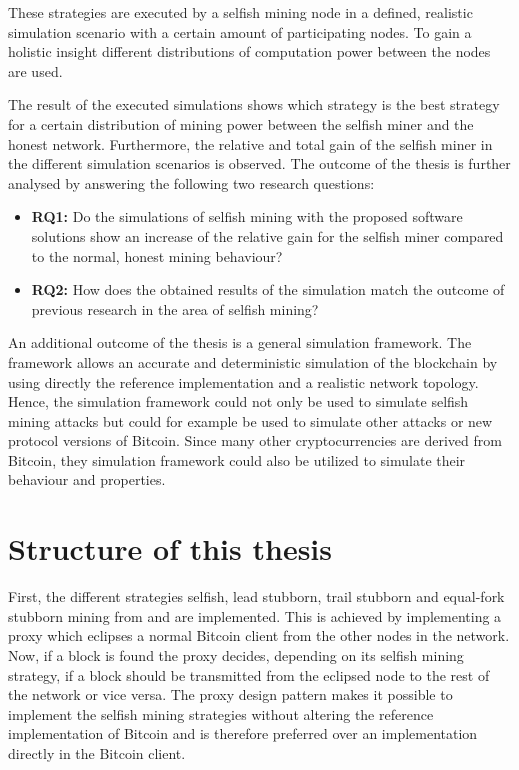 These strategies are executed by a selfish mining node in a defined, realistic simulation scenario with a certain amount of participating nodes.
To gain a holistic insight different distributions of computation power between the nodes are used.

The result of the executed simulations shows which strategy is the best strategy for a certain distribution of mining power between the selfish miner and the honest network.
Furthermore, the relative and total gain of the selfish miner in the different simulation scenarios is observed. The outcome of the thesis is further analysed by answering the following two research questions:

\begin{itemize}
	\item \textbf{RQ1:} Do the simulations of selfish mining with the proposed software solutions show an increase of the relative gain for the selfish miner compared to the normal, honest mining behaviour?

	\item \textbf{RQ2:} How does the obtained results of the simulation match the outcome of previous research in the area of selfish mining?
\end{itemize}


An additional outcome of the thesis is a general simulation framework.
The framework allows an accurate and deterministic simulation of the blockchain by using directly the reference implementation and a realistic network topology.
Hence, the simulation framework could not only be used to simulate selfish mining attacks but could for example be used to simulate other attacks or new protocol versions of Bitcoin. 
Since many other cryptocurrencies are derived from Bitcoin, they simulation framework could also be utilized to simulate their behaviour and properties.

\section{Structure of this thesis}

First, the different strategies selfish, lead stubborn, trail stubborn and equal-fork stubborn mining from \cite{nayak2016stubborn} and \cite{eyal2014majority} are implemented.
This is achieved by implementing a proxy which eclipses a normal Bitcoin client from the other nodes in the network.
Now, if a block is found the proxy decides, depending on its selfish mining strategy, if a block should be transmitted from the eclipsed node to the rest of the network or vice versa.
The proxy design pattern makes it possible to implement the selfish mining strategies without altering the reference implementation of Bitcoin and is therefore preferred over an implementation directly in the Bitcoin client.

